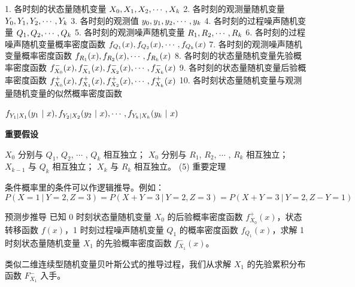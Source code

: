 \documentclass[12pt]{ctexart}
\begin{document}
1. 各时刻的状态量随机变量
$X_0, X_1, X_2, \cdots , X_k \\$
2. 各时刻的观测量随机变量
$Y_0, Y_1, Y_2, \cdots , Y_k \\$
3. 各时刻的观测值
$y_0, y_1, y_2, \cdots , y_k \\$
4. 各时刻的过程噪声随机变量
$Q_1, Q_2, \cdots , Q_k \\$
5. 各时刻的观测噪声随机变量
$R_1, R_2, \cdots , R_k \\$
6. 各时刻的过程噪声随机变量概率密度函数
$f_{Q_1}(x), f_{Q_2}(x), \cdots , f_{Q_k}(x) \\$
7. 各时刻的观测噪声随机变量概率密度函数
$f_{R_1}(x), f_{R_2}(x), \cdots , f_{R_k}(x) \\$
8. 各时刻的状态量随机变量先验概率密度函数
$f_{X_0}^-(x), f_{X_1}^-(x), f_{X_2}^-(x), \cdots , f_{X_k}^-(x) \\$
9. 各时刻的状态量随机变量后验概率密度函数
$f_{X_0}^+(x), f_{X_1}^+(x), f_{X_2}^+(x), \cdots , f_{X_k}^+(x) \\$
10. 各时刻状态量随机变量与观测量随机变量的似然概率密度函数

$f_{Y_1|X_1}(y_1 \ | \ x), f_{Y_2|X_2}(y_2 \ | \ x), \cdots , f_{Y_k|X_k}(y_k \ | \ x) \\$

\textbf{重要假设}

$X_0$ 分别与 $Q_1$, $Q_2$, $\cdots$ , $Q_k$ 相互独立；
$X_0$ 分别与 $R_1$, $R_2$, $\cdots$ , $R_k$ 相互独立；
$X_{k-1}$ 与 $Q_k$ 相互独立；
$X_{k}$ 与 $R_k$ 相互独立。
(5) 重要定理

条件概率里的条件可以作逻辑推导。例如：
\begin{equation}
P(X=1 \ | \ Y=2,Z=3)=P(X+Y=3 \ | \ Y=2,Z=3)=P(X+Y=3 \ | \ Y=2,Z-Y=1)
\end{equation}

预测步推导
已知 0 时刻状态量随机变量 $X_0$ 的后验概率密度函数 $f_{X_0}^+(x)$，状态转移函数 $f(x)$，1 时刻过程噪声随机变量 $Q_1$ 的概率密度函数 $f_{Q_1}(x)$，求解 1 时刻状态量随机变量 $X_1$ 的先验概率密度函数 $f_{X_1}^-(x)$。

类似二维连续型随机变量贝叶斯公式的推导过程，我们从求解 $X_1$ 的先验累积分布函数 $F_{X_1}^-$ 入手。
\end{document}
